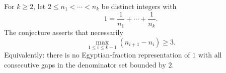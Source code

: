 For $k\ge 2$, let $2\le n_1<\cdots<n_k$ be distinct integers with
\[1=\frac1{n_1}+\cdots+\frac1{n_k}.
\]
The conjecture asserts that necessarily
\[\max_{1\le i\le k-1} (n_{i+1}-n_i)\ge 3.
\]
Equivalently: there is no Egyptian-fraction representation of $1$ with all consecutive gaps in the denominator set bounded by $2$.
